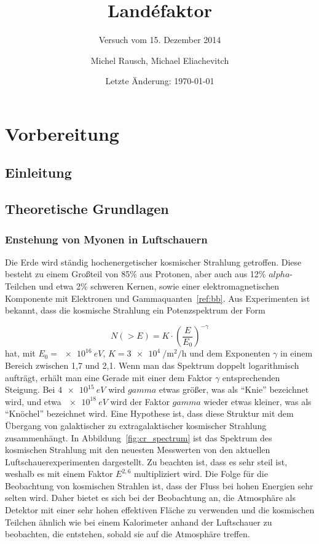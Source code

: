 \documentclass[a4paper,ngerman]{scrartcl}
\title{Landéfaktor}
\subtitle{Versuch vom 15. Dezember 2014}
\date{Letzte Änderung: \today}
\author{Michel Rausch, Michael Eliachevitch}
\begin{document}
\maketitle
\tableofcontents
\newpage

\section{Vorbereitung}

\subsection{Einleitung}
\label{sec:einfuhrung}


\subsection{Theoretische Grundlagen}
\label{sec:theorie}

\subsubsection{Enstehung von Myonen in Luftschauern}
\label{sec:luftschauer}

Die Erde wird ständig hochenergetischer kosmischer Strahlung getroffen. 
Diese besteht zu einem Großteil von 85\% aus Protonen, aber auch aus 12\% $alpha$-Teilchen und etwa 2\% schweren Kernen,
sowie einer elektromagnetischen Komponente mit Elektronen und Gammaquanten~\ref{ref:bb}.
Aus Experimenten ist bekannt, dass die kosmische Strahlung ein Potenzspektrum der Form

\begin{equation}
  N(> E) = K \cdot \left(\frac{E}{E_0}\right)^{-\gamma}
  \label{eq:powerlaw}
\end{equation}
hat, mit $E_0 = \SI{e16}{eV}$, $K = \SI{3e4}{\per\square\meter\per\hour}$ und dem Exponenten $\gamma$ in einem Bereich zwischen 1,7 und 2,1.
Wenn man das Spektrum doppelt logarithmisch aufträgt, erhält man eine Gerade mit einer dem Faktor $\gamma$ entsprechenden Steigung.
Bei $\SI{4e15}{eV}$ wird $gamma$ etwas größer, was als "`Knie"' bezeichnet wird, und etwa $\SI{e18}{eV}$ wird der Faktor $gamma$ wieder etwas kleiner, was als "`Knöchel"' bezeichnet wird. Eine Hypothese ist, dass diese Struktur mit dem Übergang von galaktischer zu extragalaktischer kosmischer Strahlung zusammenhängt. In Abbildung~\ref{fig:cr_spectrum} ist das Spektrum des kosmischen Strahlung mit den neuesten Messwerten von den aktuellen Luftschauerexperimenten dargestellt. Zu beachten ist, dass es sehr steil ist, weshalb es mit einem Faktor $E^{2,6}$ multipliziert wird. Die Folge für die Beobachtung von kosmischen Strahlen ist, dass der Fluss bei hohen Energien sehr selten wird. Daher bietet es sich bei der
Beobachtung an, die Atmosphäre als Detektor mit einer sehr hohen effektiven Fläche zu verwenden und die kosmischen Teilchen ähnlich wie bei einem Kalorimeter anhand der Luftschauer zu beobachten, die entstehen, sobald sie auf die Atmosphäre treffen.
 
\end{document}
